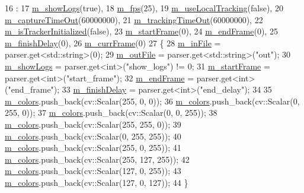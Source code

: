 \begin{DoxyCode}
16     :
17       \mbox{\hyperlink{class_video_example_af3bfe51e3e1452bb084016602c668463}{m\_showLogs}}(\textcolor{keyword}{true}),
18       \mbox{\hyperlink{class_video_example_ae8110012f8d57f39d6355377cf20fb27}{m\_fps}}(25),
19       \mbox{\hyperlink{class_video_example_a951ee017c4fbb180dfc965a9a35ac69f}{m\_useLocalTracking}}(\textcolor{keyword}{false}),
20       \mbox{\hyperlink{class_video_example_aea3c9dd66a3464fab8c61a838aff0ccf}{m\_captureTimeOut}}(60000000),
21       \mbox{\hyperlink{class_video_example_a47c8dd1d6ec7e8e18a8f7d92536c53a2}{m\_trackingTimeOut}}(60000000),
22       \mbox{\hyperlink{class_video_example_ac39c29e82360b1100d09b72b61c7c461}{m\_isTrackerInitialized}}(\textcolor{keyword}{false}),
23       \mbox{\hyperlink{class_video_example_a98dbe94b8827c5a1898e3a9423cce402}{m\_startFrame}}(0),
24       \mbox{\hyperlink{class_video_example_ae44e854b8a76b3d4f6393582afd70e67}{m\_endFrame}}(0),
25       \mbox{\hyperlink{class_video_example_ac21a646c343edd4c11db034fa2c8c085}{m\_finishDelay}}(0),
26       \mbox{\hyperlink{class_video_example_a4adccbe4084f68f10d966901b168a98a}{m\_currFrame}}(0)
27 \{
28     \mbox{\hyperlink{class_video_example_ac536e84dec6f9be505779689322b42ca}{m\_inFile}} = parser.get<std::string>(0);
29     \mbox{\hyperlink{class_video_example_a4234fb0df2f009bc3f651f01cbd5bde5}{m\_outFile}} = parser.get<std::string>(\textcolor{stringliteral}{"out"});
30     \mbox{\hyperlink{class_video_example_af3bfe51e3e1452bb084016602c668463}{m\_showLogs}} = parser.get<\textcolor{keywordtype}{int}>(\textcolor{stringliteral}{"show\_logs"}) != 0;
31     \mbox{\hyperlink{class_video_example_a98dbe94b8827c5a1898e3a9423cce402}{m\_startFrame}} = parser.get<\textcolor{keywordtype}{int}>(\textcolor{stringliteral}{"start\_frame"});
32     \mbox{\hyperlink{class_video_example_ae44e854b8a76b3d4f6393582afd70e67}{m\_endFrame}} = parser.get<\textcolor{keywordtype}{int}>(\textcolor{stringliteral}{"end\_frame"});
33     \mbox{\hyperlink{class_video_example_ac21a646c343edd4c11db034fa2c8c085}{m\_finishDelay}} = parser.get<\textcolor{keywordtype}{int}>(\textcolor{stringliteral}{"end\_delay"});
34 
35     \mbox{\hyperlink{class_video_example_a2b6d4a6e85d52d13d8899c57cc6ddc66}{m\_colors}}.push\_back(cv::Scalar(255, 0, 0));
36     \mbox{\hyperlink{class_video_example_a2b6d4a6e85d52d13d8899c57cc6ddc66}{m\_colors}}.push\_back(cv::Scalar(0, 255, 0));
37     \mbox{\hyperlink{class_video_example_a2b6d4a6e85d52d13d8899c57cc6ddc66}{m\_colors}}.push\_back(cv::Scalar(0, 0, 255));
38     \mbox{\hyperlink{class_video_example_a2b6d4a6e85d52d13d8899c57cc6ddc66}{m\_colors}}.push\_back(cv::Scalar(255, 255, 0));
39     \mbox{\hyperlink{class_video_example_a2b6d4a6e85d52d13d8899c57cc6ddc66}{m\_colors}}.push\_back(cv::Scalar(0, 255, 255));
40     \mbox{\hyperlink{class_video_example_a2b6d4a6e85d52d13d8899c57cc6ddc66}{m\_colors}}.push\_back(cv::Scalar(255, 0, 255));
41     \mbox{\hyperlink{class_video_example_a2b6d4a6e85d52d13d8899c57cc6ddc66}{m\_colors}}.push\_back(cv::Scalar(255, 127, 255));
42     \mbox{\hyperlink{class_video_example_a2b6d4a6e85d52d13d8899c57cc6ddc66}{m\_colors}}.push\_back(cv::Scalar(127, 0, 255));
43     \mbox{\hyperlink{class_video_example_a2b6d4a6e85d52d13d8899c57cc6ddc66}{m\_colors}}.push\_back(cv::Scalar(127, 0, 127));
44 \}
\end{DoxyCode}
